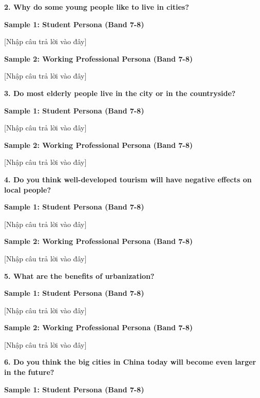 \separator

\begin{ieltsquestion}
\textbf{2. Why do some young people like to live in cities?}
\end{ieltsquestion}
\textbf{Sample 1: Student Persona (Band 7-8)}

[Nhập câu trả lời vào đây]

\textbf{Sample 2: Working Professional Persona (Band 7-8)}

[Nhập câu trả lời vào đây]

\separator

\begin{ieltsquestion}
\textbf{3. Do most elderly people live in the city or in the countryside?}
\end{ieltsquestion}
\textbf{Sample 1: Student Persona (Band 7-8)}

[Nhập câu trả lời vào đây]

\textbf{Sample 2: Working Professional Persona (Band 7-8)}

[Nhập câu trả lời vào đây]

\separator

\begin{ieltsquestion}
\textbf{4. Do you think well-developed tourism will have negative effects on local people?}
\end{ieltsquestion}
\textbf{Sample 1: Student Persona (Band 7-8)}

[Nhập câu trả lời vào đây]

\textbf{Sample 2: Working Professional Persona (Band 7-8)}

[Nhập câu trả lời vào đây]

\separator

\begin{ieltsquestion}
\textbf{5. What are the benefits of urbanization?}
\end{ieltsquestion}
\textbf{Sample 1: Student Persona (Band 7-8)}

[Nhập câu trả lời vào đây]

\textbf{Sample 2: Working Professional Persona (Band 7-8)}

[Nhập câu trả lời vào đây]

\separator

\begin{ieltsquestion}
\textbf{6. Do you think the big cities in China today will become even larger in the future?}
\end{ieltsquestion}
\textbf{Sample 1: Student Persona (Band 7-8)}

